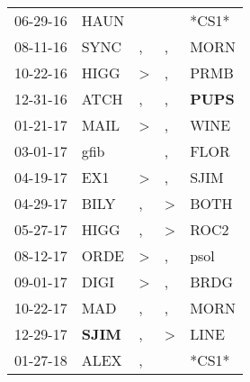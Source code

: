 \begin{supertabular}{p{0.07\textwidth}p{0.06\textwidth}p{0.02\textwidth}p{0.02\textwidth}p{0.06\textwidth}}
          06-29-16\textsuperscript{} &           HAUN\textsuperscript{} &                  &                  &                            *CS1* \\
          08-11-16\textsuperscript{} &           SYNC\textsuperscript{} &                , &                , &           MORN\textsuperscript{} \\
          10-22-16\textsuperscript{} &           HIGG\textsuperscript{} &     \textgreater &                , &           PRMB\textsuperscript{} \\
          12-31-16\textsuperscript{} &           ATCH\textsuperscript{} &                , &                , &  \textbf{PUPS\textsuperscript{}} \\
          01-21-17\textsuperscript{} &           MAIL\textsuperscript{} &     \textgreater &                , &           WINE\textsuperscript{} \\
          03-01-17\textsuperscript{} &           gfib\textsuperscript{} &                  &                , &           FLOR\textsuperscript{} \\
          04-19-17\textsuperscript{} &            EX1\textsuperscript{} &     \textgreater &                , &           SJIM\textsuperscript{} \\
          04-29-17\textsuperscript{} &           BILY\textsuperscript{} &                , &     \textgreater &           BOTH\textsuperscript{} \\
          05-27-17\textsuperscript{} &           HIGG\textsuperscript{} &                , &     \textgreater &           ROC2\textsuperscript{} \\
          08-12-17\textsuperscript{} &           ORDE\textsuperscript{} &     \textgreater &                , &           psol\textsuperscript{} \\
          09-01-17\textsuperscript{} &           DIGI\textsuperscript{} &     \textgreater &                , &           BRDG\textsuperscript{} \\
          10-22-17\textsuperscript{} &            MAD\textsuperscript{} &                , &                , &           MORN\textsuperscript{} \\
          12-29-17\textsuperscript{} &  \textbf{SJIM\textsuperscript{}} &                , &     \textgreater &           LINE\textsuperscript{} \\
          01-27-18\textsuperscript{} &           ALEX\textsuperscript{} &                , &                  &                            *CS1* \\

\end{supertabular}
